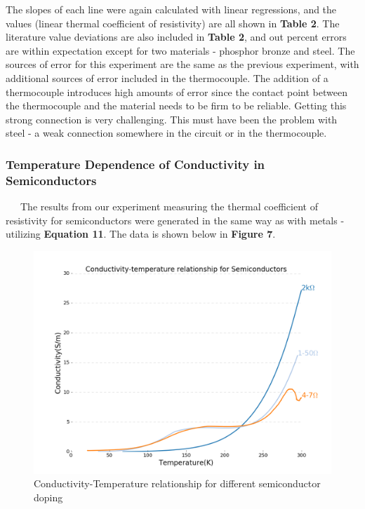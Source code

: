\documentclass[11pt]{article}
\begin{document}
The slopes of each line were again calculated with linear regressions, and the values (linear thermal coefficient of resistivity) are all shown in \textbf{Table 2}. The literature value deviations are also included in \textbf{Table 2}, and out percent errors are within expectation except for two materials - phosphor bronze and steel. The sources of error for this experiment are the same as the previous experiment, with additional sources of error included in the thermocouple. The addition of a thermocouple introduces high amounts of error since the contact point between the thermocouple and the material needs to be firm to be reliable. Getting this strong connection is very challenging. This must have been the problem with steel - a weak connection somewhere in the circuit or in the thermocouple.

\subsubsection*{Temperature Dependence of Conductivity in Semiconductors}
\ \ \ The results from our experiment measuring the thermal coefficient of resistivity for semiconductors were generated in the same way as with metals - utilizing \textbf{Equation 11}. The data is shown below in \textbf{Figure 7}.

\begin{figure}[h]
	\centering
	\includegraphics[scale=0.35]{semiconductors2.png}
	\caption{Conductivity-Temperature relationship for different semiconductor doping}
\end{figure}
\end{document}
